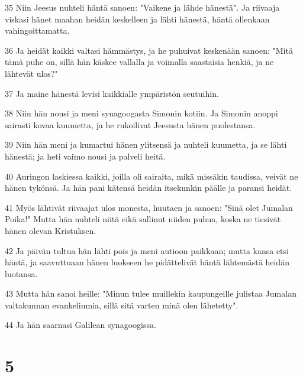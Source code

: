 \par 35 Niin Jeesus nuhteli häntä sanoen: "Vaikene ja lähde hänestä". Ja riivaaja viskasi hänet maahan heidän keskelleen ja lähti hänestä, häntä ollenkaan vahingoittamatta.
\par 36 Ja heidät kaikki valtasi hämmästys, ja he puhuivat keskenään sanoen: "Mitä tämä puhe on, sillä hän käskee vallalla ja voimalla saastaisia henkiä, ja ne lähtevät ulos?"
\par 37 Ja maine hänestä levisi kaikkialle ympäristön seutuihin.
\par 38 Niin hän nousi ja meni synagoogasta Simonin kotiin. Ja Simonin anoppi sairasti kovaa kuumetta, ja he rukoilivat Jeesusta hänen puolestansa.
\par 39 Niin hän meni ja kumartui hänen ylitsensä ja nuhteli kuumetta, ja se lähti hänestä; ja heti vaimo nousi ja palveli heitä.
\par 40 Auringon laskiessa kaikki, joilla oli sairaita, mikä missäkin taudissa, veivät ne hänen tykönsä. Ja hän pani kätensä heidän itsekunkin päälle ja paransi heidät.
\par 41 Myös lähtivät riivaajat ulos monesta, huutaen ja sanoen: "Sinä olet Jumalan Poika!" Mutta hän nuhteli niitä eikä sallinut niiden puhua, koska ne tiesivät hänen olevan Kristuksen.
\par 42 Ja päivän tultua hän lähti pois ja meni autioon paikkaan; mutta kansa etsi häntä, ja saavuttuaan hänen luokseen he pidättelivät häntä lähtemästä heidän luotansa.
\par 43 Mutta hän sanoi heille: "Minun tulee muillekin kaupungeille julistaa Jumalan valtakunnan evankeliumia, sillä sitä varten minä olen lähetetty".
\par 44 Ja hän saarnasi Galilean synagoogissa.

\chapter{5}

